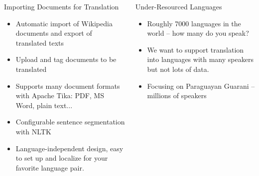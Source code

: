 \documentclass[final]{beamer}
\begin{document}
\begin{frame}{}
\begin{columns}[t]
\begin{column}{.32\linewidth}
  \begin{block}{\large Importing Documents for Translation}
    \centering
    \begin{itemize}
    \item Automatic import of Wikipedia documents and export of translated texts
    \item Upload and tag documents to be translated
    \item Supports many document formats with Apache Tika: PDF, MS Word, plain
    text...
    \item Configurable sentence segmentation with NLTK
    \item Language-independent design, easy to set up and localize for your
    favorite language pair.
    \end{itemize}
  \end{block}

  \end{column}

  \begin{column}{.32\linewidth}
  \vfill
  \begin{block}{\large Under-Resourced Languages}
    \begin{itemize}
    \item Roughly 7000 languages in the world -- how many do you speak?
    \item We want to support translation into languages with many speakers
    but not lots of data.
    \item Focusing on Paraguayan Guarani -- millions of speakers
    \end{itemize}
  \end{block}


\end{column}
\end{columns}
\end{frame}
\end{document}
